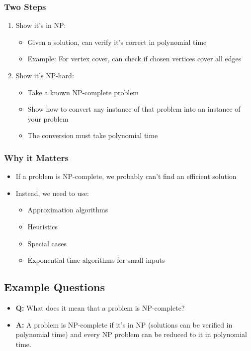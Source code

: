 \documentclass[11pt,a4paper]{article}
\begin{document}
\begin{multicols}{2}
\subsubsection{Two Steps}
\begin{enumerate}
    \item Show it's in NP:
    \begin{itemize}
        \item Given a solution, can verify it's correct in polynomial time
        \item Example: For vertex cover, can check if chosen vertices cover all edges
    \end{itemize}
    \item Show it's NP-hard:
    \begin{itemize}
        \item Take a known NP-complete problem
        \item Show how to convert any instance of that problem into an instance of your problem
        \item The conversion must take polynomial time
    \end{itemize}
\end{enumerate}

\subsubsection{Why it Matters}
\begin{itemize}
    \item If a problem is NP-complete, we probably can't find an efficient solution
    \item Instead, we need to use:
    \begin{itemize}
        \item Approximation algorithms
        \item Heuristics
        \item Special cases
        \item Exponential-time algorithms for small inputs
    \end{itemize}
\end{itemize}

\subsection{Example Questions}
\begin{itemize}
    \item \textbf{Q:} What does it mean that a problem is NP-complete?
    \item \textbf{A:} A problem is NP-complete if it's in NP (solutions can be verified in polynomial time) and every NP problem can be reduced to it in polynomial time.


\end{itemize}
\end{multicols}
\end{document}
